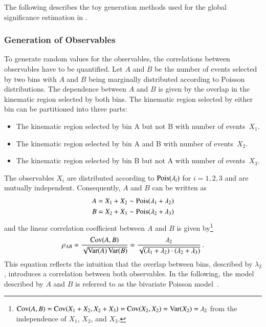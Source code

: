 The following describes the toy generation methods used for the global
significance estimation in .


\subsubsection{Generation of Observables}

To generate random values for the observables, the correlations between
observables have to be quantified. Let $A$ and $B$ be the number of events
selected by two bins with $A$ and $B$ being marginally distributed according to
Poisson distributions. The dependence between $A$ and $B$ is given by the
overlap in the kinematic region selected by both bins. The kinematic region
selected by either bin can be partitioned into three parts:
\begin{itemize}

\item The kinematic region selected by bin A but not B with number of
  events~$X_1$.

\item The kinematic region selected by bin A and B with number of events~$X_2$.

\item The kinematic region selected by bin B but not A with number of
  events~$X_3$.

\end{itemize}
The observables $X_i$ are distributed according to $\operatorname{Pois}(\lambda_i)$ for
$i = 1, 2, 3$ and are mutually independent. Consequently, $A$ and $B$ can be
written as
\begin{align*}
  A &= X_1 + X_2 \sim \operatorname{Pois}(\lambda_1 + \lambda_2) \\
  B &= X_2 + X_3 \sim \operatorname{Pois}(\lambda_2 + \lambda_3)
\end{align*}
and the linear correlation coefficient between $A$ and $B$ is given
by\footnote{$\operatorname{Cov}(A,B) = \operatorname{Cov}(X_1 + X_2, X_2 + X_3) = \operatorname{Cov}(X_2, X_2) = \operatorname{Var}(X_2)
  = \lambda_2$ from the independence of $X_1$, $X_2$, and $X_3$.}
\begin{align*}
  \rho_{AB} = \frac{\operatorname{Cov}(A, B)}{\sqrt{\operatorname{Var}(A)\operatorname{Var}(B)}}
  = \frac{\lambda_2}{\sqrt{(\lambda_1 + \lambda_2) \cdot (\lambda_2 + \lambda_3)}} \,\text{.}
\end{align*}
This equation reflects the intuition that the overlap between bins, described by
$\lambda_2$, introduces a correlation between both observables. In the
following, the model described by $A$ and $B$ is referred to as the bivariate
Poisson model~\cite{teicher1954}.

